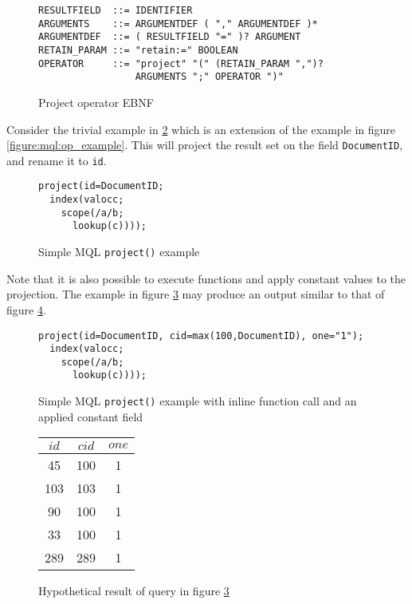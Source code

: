 \begin{figure}[!h]
\centering
\begin{Verbatim}
RESULTFIELD  ::= IDENTIFIER
ARGUMENTS    ::= ARGUMENTDEF ( "," ARGUMENTDEF )*
ARGUMENTDEF  ::= ( RESULTFIELD "=" )? ARGUMENT
RETAIN_PARAM ::= "retain:=" BOOLEAN
OPERATOR     ::= "project" "(" (RETAIN_PARAM ",")? 
                 ARGUMENTS ";" OPERATOR ")"
\end{Verbatim}
\caption{Project operator EBNF}
\label{figure:mql:ebnf:project_ebnf}
\end{figure}
Consider the trivial example in \ref{figure:mql:project_example} which is an
extension of the example in figure \ref{figure:mql:op_example}. This will
project the result set on the field \texttt{DocumentID}, and rename it to
\texttt{id}. 

\begin{figure}[!h]
\centering
\begin{Verbatim}
project(id=DocumentID;
  index(valocc; 
    scope(/a/b;
      lookup(c))));
\end{Verbatim}
\caption{Simple MQL \texttt{project()} example}
\label{figure:mql:project_example}
\end{figure}

Note that it is also possible to execute functions and apply constant values to
the projection. The example in figure \ref{figure:mql:project_example2} may
produce an output similar to that of figure
\ref{figure:mql:project_example2_result}.

\begin{figure}[!h]
\centering
\begin{Verbatim}
project(id=DocumentID, cid=max(100,DocumentID), one="1");
  index(valocc;
    scope(/a/b;
      lookup(c))));
\end{Verbatim}
\caption{Simple MQL \texttt{project()} example with inline function call 
and an applied constant field}
\label{figure:mql:project_example2}
\end{figure}

\begin{figure}[!h]
\centering
\begin{tabular}{|c | c | c |}
\hline
$id$ & $cid$ & $one$ \\ \hline
45 & 100 & 1 \\ \hline
103 & 103 & 1 \\ \hline
90 & 100 & 1 \\ \hline
33 & 100 & 1 \\ \hline
289 & 289 & 1 \\ \hline
\end{tabular}
\caption{Hypothetical result of query in figure
\ref{figure:mql:project_example2}}
\label{figure:mql:project_example2_result}
\end{figure}

